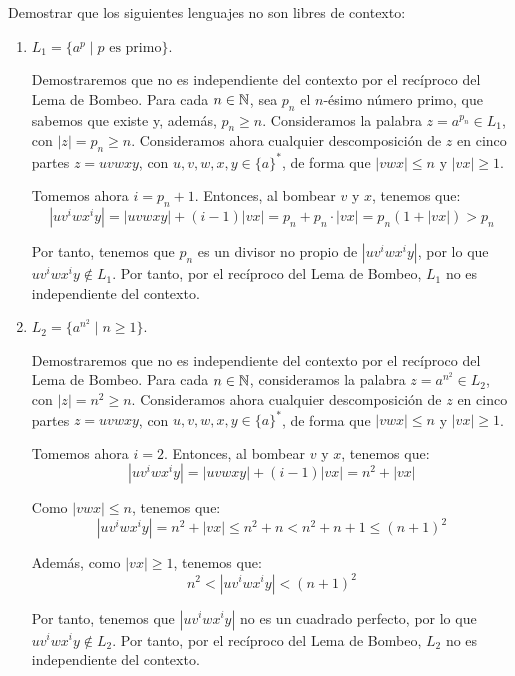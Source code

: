 \begin{ejercicio}\label{ej:1.6.3}
    Demostrar que los siguientes lenguajes no son libres de contexto:
    \begin{enumerate}
        \item $L_1 = \{a^p \mid p \text{\ es primo}\}$.
        
        Demostraremos que no es independiente del contexto por el recíproco del Lema de Bombeo. Para cada $n\in \mathbb{N}$, sea $p_n$ el $n$-ésimo número primo, que sabemos que existe y, además, $p_n\geq n$. Consideramos la palabra $z=a^{p_n}\in L_1$, con $|z|=p_n\geq n$. Consideramos ahora cualquier descomposición de $z$ en cinco partes $z=uvwxy$, con $u,v,w,x,y\in {\{a\}}^{\ast}$, de forma que $|vwx|\leq n$ y $|vx|\geq 1$.

        Tomemos ahora $i=p_n+1$. Entonces, al bombear $v$ y $x$, tenemos que:
        \begin{equation*}
            |uv^iwx^iy| = |uvwxy| + (i-1)|vx| = p_n + p_n\cdot |vx| = p_n(1+|vx|) > p_n
        \end{equation*}

        Por tanto, tenemos que $p_n$ es un divisor no propio de $|uv^iwx^iy|$, por lo que $uv^iwx^iy\notin L_1$.
        Por tanto, por el recíproco del Lema de Bombeo, $L_1$ no es independiente del contexto.
        \item \label{ej:1.6.3-2}
        $L_2 = \{a^{n^2}\mid n\geq 1\}$.
        
        Demostraremos que no es independiente del contexto por el recíproco del Lema de Bombeo. Para cada $n\in \mathbb{N}$, consideramos la palabra $z=a^{n^2}\in L_2$, con $|z|=n^2\geq n$. Consideramos ahora cualquier descomposición de $z$ en cinco partes $z=uvwxy$, con $u,v,w,x,y\in {\{a\}}^{\ast}$, de forma que $|vwx|\leq n$ y $|vx|\geq 1$.
        
        Tomemos ahora $i=2$. Entonces, al bombear $v$ y $x$, tenemos que:
        \begin{equation*}
            |uv^iwx^iy| = |uvwxy| + (i-1)|vx| = n^2 + |vx|
        \end{equation*}

        Como $|vwx|\leq n$, tenemos que:
        \begin{equation*}
            |uv^iwx^iy| = n^2 + |vx| \leq n^2 + n < n^2+n+1\leq (n+1)^2
        \end{equation*}

        Además, como $|vx|\geq 1$, tenemos que:
        \begin{equation*}
            n^2<|uv^iwx^iy|<(n+1)^2
        \end{equation*}

        Por tanto, tenemos que $|uv^iwx^iy|$ no es un cuadrado perfecto, por lo que $uv^iwx^iy\notin L_2$.
        Por tanto, por el recíproco del Lema de Bombeo, $L_2$ no es independiente del contexto.
    \end{enumerate}
\end{ejercicio}


